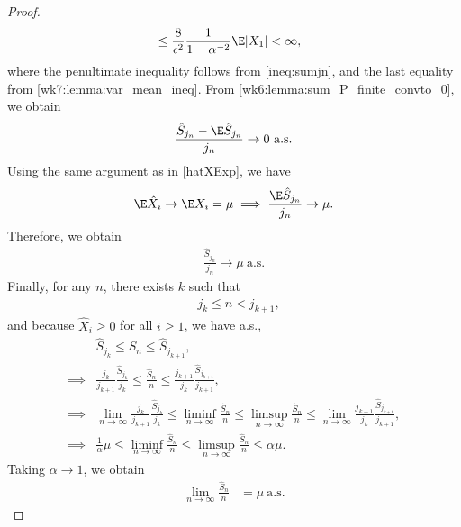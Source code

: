 \documentclass[../aipt.tex]{subfiles}
\begin{document}
\begin{proof}
\begin{align*}
&\leq \frac{8}{\epsilon^2} \frac{1}{1 - \alpha^{-2}} \E |X_1| < \infty,
\end{align*}
where the penultimate inequality follows from \cref{ineq:sumjn}, and the last equality from \cref{wk7:lemma:var_mean_ineq}. From \cref{wk6:lemma:sum_P_finite_convto_0}, we obtain
\begin{align*}
\frac{\hat{S}_{j_n} - \E \hat{S}_{j_n}}{j_n} \to 0 \ \text{a.s.}
\end{align*}
Using the same argument as in \cref{hatXExp}, we have
\begin{align*}
\E \hat{X}_i \to \E X_i = \mu
\implies
\frac{\E \hat{S}_{j_n}}{j_n} \to \mu.
\end{align*}
Therefore, we obtain
\begin{align*}
\frac{\hat{S}_{j_n}}{j_n} \to \mu \ \text{a.s.}
\end{align*}
Finally, for any $n$, there exists $k$ such that 
\begin{align*}
&j_k \leq n < j_{k+1}, 
\end{align*}
and because $\hat{X}_i \geq 0$ for all $i\geq 1$, we have a.s.,
\begin{align*}
&\hat{S}_{j_k} \leq \hat{S}_n \leq \hat{S}_{j_{k+1}}, \\
\implies
&\frac{j_k}{j_{k+1}} \frac{\hat{S}_{j_k}}{j_k} \leq \frac{\hat{S}_n}{n} \leq \frac{j_{k+1}}{j_k} \frac{\hat{S}_{j_{k+1}}}{j_{k+1}}, \\
\implies
&\lim_{n \to \infty} \frac{j_k}{j_{k+1}} \frac{\hat{S}_{j_k}}{j_k} \leq \liminf_{n \to \infty} \frac{\hat{S}_n}{n} \leq \limsup_{n \to \infty} \frac{\hat{S}_n}{n} \leq \lim_{n \to \infty} \frac{j_{k+1}}{j_k} \frac{\hat{S}_{j_{k+1}}}{j_{k+1}}, \\
\implies
&\frac{1}{\alpha} \mu \leq \liminf_{n \to \infty} \frac{\hat{S}_n}{n}\leq \limsup_{n \to \infty} \frac{\hat{S}_n}{n} \leq \alpha \mu.
\end{align*}
Taking $\alpha \to 1$, we obtain
\begin{align*}
\lim_{n \to \infty} \frac{\hat{S}_n}{n} &= \mu\ \text{a.s.}
\end{align*}
\end{proof}
%
%

\end{document}
